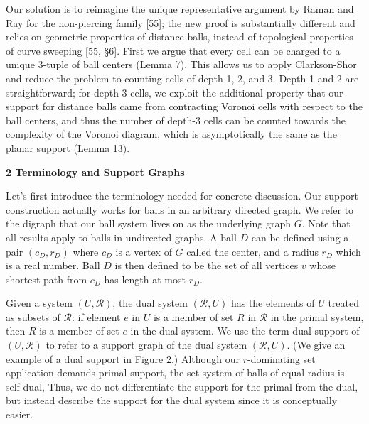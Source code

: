 \par
\par
Our solution is to reimagine the unique representative argument by Raman and Ray for the non-piercing family [55]; the new proof is substantially different and relies on geometric properties of distance balls, instead of topological properties of curve sweeping [55, §6]. First we argue that every cell can be charged to a unique 3-tuple of ball centers (Lemma 7). This allows us to apply Clarkson-Shor and reduce the problem to counting cells of depth 1, 2, and 3. Depth 1 and 2 are straightforward; for depth-3 cells, we exploit the additional property that our support for distance balls came from contracting Voronoi cells with respect to the ball centers, and thus the number of depth-3 cells can be counted towards the complexity of the Voronoi diagram, which is asymptotically the same as the planar support (Lemma 13).
\par
\par
\par\medskip\noindent\textbf{2 Terminology and Support Graphs}\par
Let’s first introduce the terminology needed for concrete discussion. Our support construction actually works for balls in an arbitrary directed graph. We refer to the digraph that our ball system lives on as the underlying graph $G$. Note that all results apply to balls in undirected graphs. A ball $D$ can be defined using a pair $(c_{D},r_{D})$ where $c_{D}$ is a vertex of $G$ called the center, and a radius $r_{D}$ which is a real number. Ball $D$ is then defined to be the set of all vertices $v$ whose shortest path from $c_{D}$ has length at most $r_{D}$.
\par
\par
Given a system $(U,\mathcal{R})$, the dual system $(\mathcal{R},U)$ has the elements of $U$ treated as subsets of $\mathcal{R}$: if element $e$ in $U$ is a member of set $R$ in $\mathcal{R}$ in the primal system, then $R$ is a member of set $e$ in the dual system. We use the term dual support of $(U,\mathcal{R})$ to refer to a support graph of the dual system $(\mathcal{R},U)$. (We give an example of a dual support in Figure 2.) Although our $r$-dominating set application demands primal support, the set system of balls of equal radius is self-dual, Thus, we do not differentiate the support for the primal from the dual, but instead describe the support for the dual system since it is conceptually easier.
